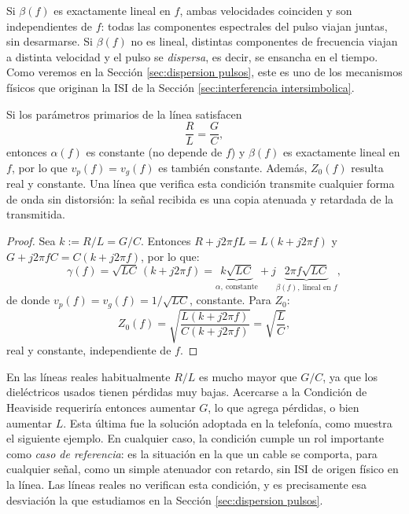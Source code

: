 Si $\beta(f)$ es exactamente lineal en $f$, ambas velocidades coinciden y son independientes de $f$: todas las componentes espectrales del pulso viajan juntas, sin desarmarse. Si $\beta(f)$ no es lineal, distintas componentes de frecuencia viajan a distinta velocidad y el pulso se \emph{dispersa}, es decir, se ensancha en el tiempo. Como veremos en la Sección \ref{sec:dispersion pulsos}, este es uno de los mecanismos físicos que originan la ISI de la Sección \ref{sec:interferencia intersimbolica}.

\begin{condicion}\label{cond:heaviside}
Si los parámetros primarios de la línea satisfacen
\begin{equation*}
    \frac{R}{L} = \frac{G}{C},
\end{equation*}
entonces $\alpha(f)$ es constante (no depende de $f$) y $\beta(f)$ es exactamente lineal en $f$, por lo que $v_p(f)=v_g(f)$ es también constante. Además, $Z_0(f)$ resulta real y constante. Una línea que verifica esta condición transmite cualquier forma de onda sin distorsión: la señal recibida es una copia atenuada y retardada de la transmitida.
\end{condicion}

\begin{proof}
Sea $k:=R/L=G/C$. Entonces $R+j2\pi f L = L(k+j2\pi f)$ y $G+j2\pi f C = C(k+j2\pi f)$, por lo que:
\begin{equation*}
    \gamma(f) = \sqrt{LC}\,(k+j2\pi f) = \underbrace{k\sqrt{LC}}_{\alpha,\ \text{constante}} + j\underbrace{2\pi f \sqrt{LC}}_{\beta(f),\ \text{lineal en } f},
\end{equation*}
de donde $v_p(f)=v_g(f)=1/\sqrt{LC}$, constante. Para $Z_0$:
\begin{equation*}
    Z_0(f) = \sqrt{\frac{L(k+j2\pi f)}{C(k+j2\pi f)}} = \sqrt{\frac{L}{C}},
\end{equation*}
real y constante, independiente de $f$.
\end{proof}

En las líneas reales habitualmente $R/L$ es mucho mayor que $G/C$, ya que los dieléctricos usados tienen pérdidas muy bajas. Acercarse a la Condición de Heaviside requeriría entonces aumentar $G$, lo que agrega pérdidas, o bien aumentar $L$. Esta última fue la solución adoptada en la telefonía, como muestra el siguiente ejemplo. En cualquier caso, la condición cumple un rol importante como \emph{caso de referencia}: es la situación en la que un cable se comporta, para cualquier señal, como un simple atenuador con retardo, sin ISI de origen físico en la línea. Las líneas reales no verifican esta condición, y es precisamente esa desviación la que estudiamos en la Sección \ref{sec:dispersion pulsos}.


